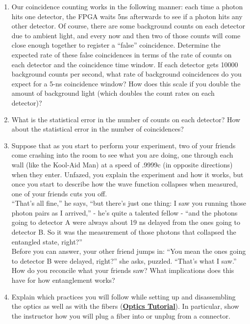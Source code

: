 \documentclass{../signatures}
\begin{document}
\begin{enumerate}
    \item Our coincidence counting works in the following manner: each time a photon hits one detector, the FPGA waits 5ns afterwards to see if a photon hits any other detector. Of course, there are some background counts on each detector due to ambient light, and every now and then two of those counts will come close enough together to register a ``false'' coincidence. Determine the expected rate of these false coincidences in terms of the rate of counts on each detector and the coincidence time window. If each detector gets 10000 background counts per second, what rate of background coincidences do you expect for a 5-ns coincidence window? How does this scale if you double the amount of background light (which doubles the count rates on each detector)?

    \item What is the statistical error in the number of counts on each detector? How about the statistical error in the number of coincidences?

    \item Suppose that as you start to perform your experiment, two of your friends come crashing into the room to see what you are doing, one through each wall (like the Kool-Aid Man) at a speed of .9999c (in opposite directions) when they enter. Unfazed, you explain the experiment and how it works, but once you start to describe how the wave function collapses when measured, one of your friends cuts you off.
    \\``That's all fine,'' he says, ``but there's just one thing: I saw you running those photon pairs as I arrived,'' - he's quite a talented fellow - ``and the photons going to detector A were always about 19 ns delayed from the ones going to detector B. So it was the measurement of those photons that collapsed the entangled state, right?''\\
    Before you can answer, your other friend jumps in: ``You mean the ones going to detector B were delayed, right?'' she asks, puzzled. ``That's what I saw.''\\
    How do you reconcile what your friends saw? What implications does this have for how entanglement works?

    \item Explain which practices you will follow while setting up and disassembling the optics as well as with the fibers (\href{http://experimentationlab.berkeley.edu/OpticsTutorial}{\textbf{Optics Tutorial}}). In particular, show the instructor how you will plug a fiber into or unplug from a connector.
    \\[32pt]
\end{enumerate}
\end{document}
